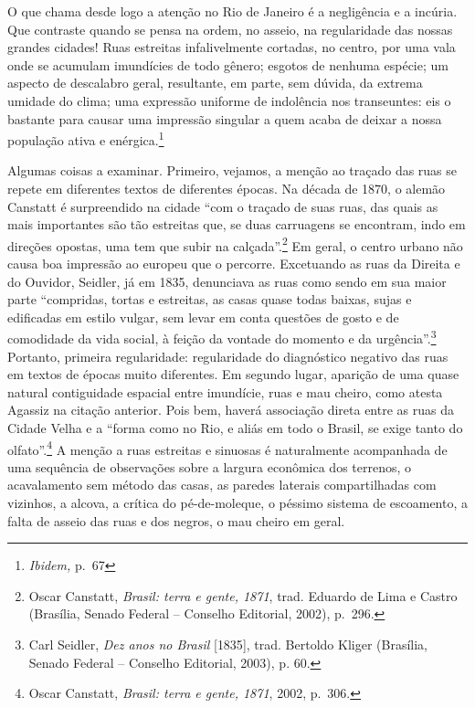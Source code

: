O que chama desde logo a atenção no Rio de Janeiro é a negligência e a
incúria. Que contraste quando se pensa na ordem, no asseio, na
regularidade das nossas grandes cidades! Ruas estreitas infalivelmente
cortadas, no centro, por uma vala onde se acumulam imundícies de todo
gênero; esgotos de nenhuma espécie; um aspecto de descalabro geral,
resultante, em parte, sem dúvida, da extrema umidade do clima; uma
expressão uniforme de indolência nos transeuntes: eis o bastante para
causar uma impressão singular a quem acaba de deixar a nossa população
ativa e enérgica.\footnote{\emph{Ibidem,} p.~67}

Algumas coisas a examinar. Primeiro, vejamos, a menção ao traçado das
ruas se repete em diferentes textos de diferentes épocas. Na década de
1870, o alemão Canstatt é surpreendido na cidade ``com o traçado de suas
ruas, das quais as mais importantes são tão estreitas que, se duas
carruagens se encontram, indo em direções opostas, uma tem que subir na
calçada''.\footnote{Oscar Canstatt, \emph{Brasil: terra e gente, 1871},
  trad. Eduardo de Lima e Castro (Brasília, Senado Federal -- Conselho
  Editorial, 2002), p.~296.} Em geral, o centro urbano não causa boa
impressão ao europeu que o percorre. Excetuando as ruas da Direita e do
Ouvidor, Seidler, já em 1835, denunciava as ruas como sendo em sua maior
parte ``compridas, tortas e estreitas, as casas quase todas baixas,
sujas e edificadas em estilo vulgar, sem levar em conta questões de
gosto e de comodidade da vida social, à feição da vontade do momento e
da urgência''.\footnote{Carl Seidler, \emph{Dez anos no Brasil}
  {[}1835{]}, trad. Bertoldo Kliger (Brasília, Senado Federal --
  Conselho Editorial, 2003), p. 60.} Portanto, primeira regularidade:
regularidade do diagnóstico negativo das ruas em textos de épocas muito
diferentes. Em segundo lugar, aparição de uma quase natural contiguidade
espacial entre imundície, ruas e mau cheiro, como atesta Agassiz na
citação anterior. Pois bem, haverá associação direta entre as ruas da
Cidade Velha e a ``forma como no Rio, e aliás em todo o Brasil, se exige
tanto do olfato''.\footnote{Oscar Canstatt, \emph{Brasil: terra e gente,
  1871}, 2002, p.~306.} A menção a ruas estreitas e sinuosas é
naturalmente acompanhada de uma sequência de observações sobre a largura
econômica dos terrenos, o acavalamento sem método das casas, as paredes
laterais compartilhadas com vizinhos, a alcova, a crítica do
pé-de-moleque, o péssimo sistema de escoamento, a falta de asseio das
ruas e dos negros, o mau cheiro em geral.

